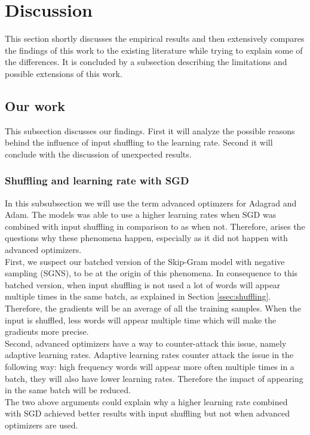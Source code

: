 \section{Discussion}\label{sec:discussion}

This section shortly discusses the empirical results and then extensively compares the findings of this work to the existing literature while trying to explain some of the differences. It is concluded by a subsection describing the limitations and possible extensions of this work. 

\subsection{Our work}
This subsection discusses our findings. First it will analyze the possible reasons behind the influence of input shuffling to the learning rate. Second it will conclude with the discussion of unexpected results. 

\subsubsection{Shuffling and learning rate with SGD}
In this subsubsection we will use the term advanced optimzers for Adagrad and Adam. The models was able to use a higher learning rates when SGD was combined with input shuffling in comparison to as when not. Therefore, arises the questions why these phenomena happen, especially as it did not happen with advanced optimizers.  \\
First, we suspect our batched version of the Skip-Gram model with negative sampling (SGNS), to be at the origin of this phenomena. In consequence to this batched version, when input shuffling is not used a lot of words will appear multiple times in the same batch, as explained in Section \ref{ssec:shuffling}. Therefore, the gradients will be an average of all the training samples. When the input is shuffled, less words will appear multiple time which will make the gradients more precise.\\
Second, advanced optimizers have a way to counter-attack this issue, namely adaptive learning rates. Adaptive learning rates counter attack the issue in the following way: high frequency words  will appear more often multiple times in a batch, they will also have lower learning rates. Therefore the impact of appearing in the same batch will be reduced. \\  The two above arguments could explain why a higher learning rate combined with SGD achieved better results with input shuffling but not when advanced optimizers are used. 

